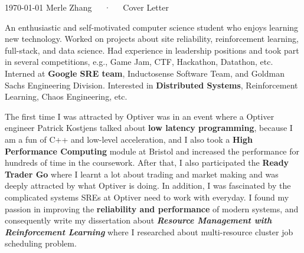 \documentclass[11pt, a4paper]{awesome-cv}
\begin{document}
\makecvheader[C]

\makecvfooter
  {\today}
  {Merle Zhang~~~·~~~Cover Letter}
  {}

\makelettertitle

\begin{cvletter}

An enthusiastic and self-motivated computer science student who enjoys learning new technology. 
Worked on projects about site reliability, reinforcement learning, full-stack, and data science. Had experience in leadership positions and took part in several competitions, e.g., Game Jam, CTF, Hackathon, Datathon, etc. Interned at \textbf{Google SRE team}, Inductosense Software Team, and Goldman Sachs Engineering Division. Interested in \textbf{Distributed Systems}, Reinforcement Learning, Chaos Engineering, etc.

The first time I was attracted by Optiver was in an event where a Optiver engineer Patrick Kostjens talked about \textbf{low latency programming}, because I am a fun of C++ and low-level acceleration, and I also took a \textbf{High Performance Computing} module at Bristol and increased the performance for hundreds of time in the coursework. After that, I also participated the \textbf{Ready Trader Go} where I learnt a lot about trading and market making and was deeply attracted by what Optiver is doing. In addition, I was fascinated by the complicated systems SREs at Optiver need to work with everyday. I found my passion in improving the \textbf{reliability and performance} of modern systems, and consequently write my dissertation about \textbf{\textit{Resource Management with Reinforcement Learning}} where I researched about multi-resource cluster job scheduling problem.


\end{cvletter}
\end{document}

